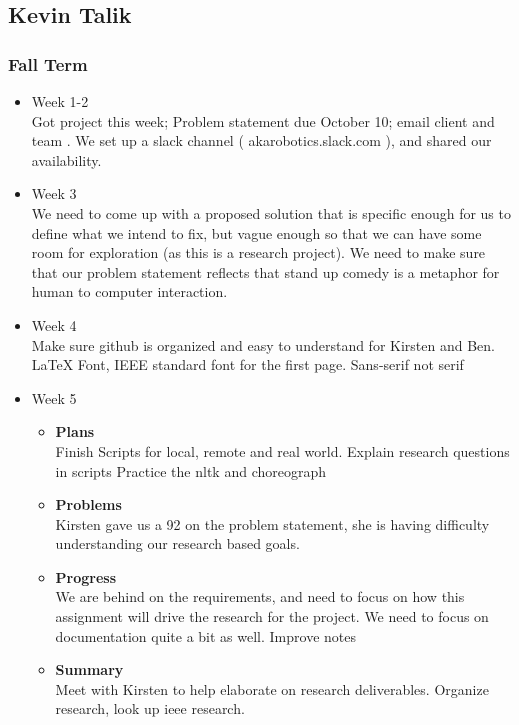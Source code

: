
\subsection{Kevin Talik}
	\subsubsection{Fall Term}
	\begin{itemize}
		\item{Week 1-2} \\
			Got project this week; Problem statement due October 10; email client and team . 
			We set up a slack channel ( akarobotics.slack.com ), and shared our availability. 
		\item{Week 3} \\
			We need to come up with a proposed solution that is specific enough for us to define what we intend to fix, but vague enough so that we can have some room for exploration (as this is a research project). 
			We need to make sure that our problem statement reflects that stand up comedy is a metaphor for human to computer interaction. 

		\item{Week 4} \\
		Make sure github is organized and easy to understand for Kirsten and Ben. 
		LaTeX Font, IEEE standard font for the first page. Sans-serif not serif 
		\item{Week 5}
			\begin{itemize}
				\item \textbf{Plans} \\
				Finish Scripts for local, remote and real world. 
				Explain research questions in scripts 
				Practice the nltk and choreograph 
				\item \textbf{Problems} \\
				Kirsten gave us a 92 on the problem statement, she is having difficulty understanding our research based goals. 
				\item \textbf{Progress} \\
				We are behind on the requirements, and need to focus on how this assignment will drive the research for the project.
				We need to focus on documentation quite a bit as well. Improve notes
				\item \textbf{Summary} \\
				Meet with Kirsten to help elaborate on research deliverables.  
				Organize research, look up ieee research. 
			\end{itemize}


\end{itemize}
